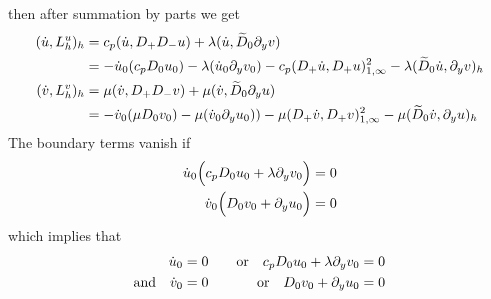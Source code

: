 then after summation by parts we get 
\begin{align*}
 (\dot{u},L^u_h)_h &=  c_p (\dot{u}, D_+D_- u) + \lambda(\dot{u},\widetilde{D}_0\partial_y v)  \\
           &   = -\dot{u}_0( c_p D_0 u_0 ) - \lambda(\dot{u}_0\partial_y v_{0} ) 
                                - c_p (D_+\dot{u}, D_+ u)_{1,\infty}^2 - \lambda (\widetilde{D}_0 \dot{u},\partial_y v)_h \\
 (\dot{v},L^v_h)_h &=   \mu  (\dot{v}, D_+D_- v) + \mu    (\dot{v},\widetilde{D}_0\partial_y u)  \\
           &   = -\dot{v}_0( \mu D_0 v_0 ) - \mu( \dot{v}_0\partial_y u_{0}) )
                             -\mu (D_+\dot{v}, D_+ v )_{1,\infty}^2  - \mu (\widetilde{D}_0 \dot{v},\partial_y u)_h
\end{align*}
The boundary terms vanish if 
\begin{align*}
\dot{u}_0\Big( c_p D_0 u_0 + \lambda \partial_y v_{0} \Big) &=0 \\
\dot{v}_0\Big(  D_0 v_0 +  \partial_y u_{0} \Big) &=0 
\end{align*}
which implies that 
\begin{alignat*}{3}
                   \dot{u}_0 &= 0 \quad&\text{or}\quad  c_p D_0 u_0 + \lambda \partial_y v_0 &= 0 \\
\text{and}\quad    \dot{v}_0 &= 0  \quad&\text{or}\quad   D_0 v_0 + \partial_y u_0 &= 0 \\
\end{alignat*}



